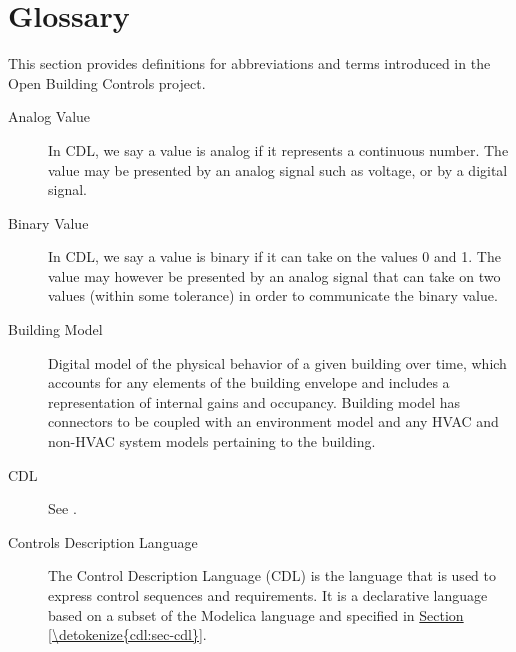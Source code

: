 \documentclass[letterpaper,10pt, openany,english]{sphinxmanual}
\begin{document}
\chapter{Glossary}
\label{\detokenize{glossary:glossary}}\label{\detokenize{glossary:sec-glossary}}\label{\detokenize{glossary::doc}}
This section provides definitions for abbreviations and terms introduced in
the Open Building Controls project.
\begin{description}
\item[{Analog Value\label{\detokenize{glossary:term-analog-value}}}] \leavevmode
In CDL, we say a value is analog if it represents a continuous
number. The value may be presented by an analog signal such as
voltage, or by a digital signal.

\item[{Binary Value\label{\detokenize{glossary:term-binary-value}}}] \leavevmode
In CDL, we say a value is binary if it can take on the values
0 and 1. The value may however be presented by an analog signal
that can take on two values (within some tolerance) in order
to communicate the binary value.

\item[{Building Model\label{\detokenize{glossary:term-building-model}}}] \leavevmode
Digital model of the physical behavior of a given building over time,
which accounts for any elements of the building envelope and includes a
representation of internal gains and occupancy. Building model has connectors
to be coupled with an environment model and any HVAC and non-HVAC system models
pertaining to the building.

\item[{CDL\label{\detokenize{glossary:term-cdl}}}] \leavevmode
See {\hyperref[\detokenize{glossary:term-controls-description-language}]{}}.

\item[{Controls Description Language\label{\detokenize{glossary:term-controls-description-language}}}] \leavevmode
The Control Description Language (CDL) is the language
that is used to express control sequences and requirements.
It is a declarative language based on a subset of the
Modelica language and specified in \hyperref[\detokenize{cdl:sec-cdl}]{Section \ref{\detokenize{cdl:sec-cdl}}}.


\end{description}
\end{document}
